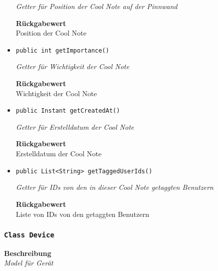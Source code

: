 \begin{itemize}
     	\textit{Getter für Position der Cool Note auf der Pinnwand}
     	
     	
     	
     	\textbf{Rückgabewert} \\
     	Position der Cool Note        \item{\texttt{public int getImportance()}}
     	
     	\textit{Getter für Wichtigkeit der Cool Note}
     	
     	
     	
     	\textbf{Rückgabewert} \\
     	Wichtigkeit der Cool Note        \item{\texttt{public Instant getCreatedAt()}}
     	
     	\textit{Getter für Erstelldatum der Cool Note}
     	
     	
     	
     	\textbf{Rückgabewert} \\
     	Erstelldatum der Cool Note        \item{\texttt{public List<String> getTaggedUserIds()}}
     	
     	\textit{Getter für IDs von den in dieser Cool Note getaggten Benutzern}
     	
     	
     	
     	\textbf{Rückgabewert} \\
     	Liste von IDs von den getaggten Benutzern
     \end{itemize}
     \subsubsection{\texttt{Class Device}}
     \textbf{Beschreibung} \\
     \textit{Model für Gerät}
